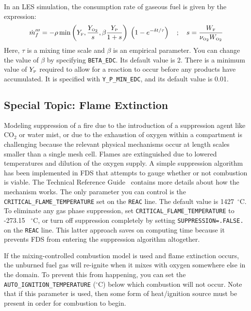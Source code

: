 \documentclass[11pt]{book}
\newcommand{\ct}{\tt\small}
\newcommand{\dt}{\delta t}
\newcommand{\dm}{\dot{m}}
\newcommand{\be}{\begin{equation}}
\newcommand{\ee}{\end{equation}}
\newcommand{\OTWO}{{\tiny \hbox{O}_2}}
\newcommand{\F}{{\tiny \hbox{F}}}
\begin{document}
In an LES simulation, the consumption rate of gaseous fuel is given by the expression:
\be \dm_f''' = -\rho \min \left( Y_\F , \frac{Y_\OTWO}{s}, \beta \frac{Y_{\hbox{\tiny P}}}{1+s} \right) \; \left( 1 - e^{-\dt/\tau} \right)   \quad ; \quad
   s=\frac{W_\F}{\nu_{\OTWO} W_{\OTWO} }  \ee
Here, $\tau$ is a mixing time scale and $\beta$ is an empirical parameter. You can change the value of $\beta$ by specifying {\ct BETA\_EDC}. Its default value
is 2. There is a minimum value of $Y_{\hbox{\tiny P}}$ required to allow for a reaction to occur before any products have accumulated. It is specified with
{\ct Y\_P\_MIN\_EDC}, and its default value is 0.01.




\subsection{Special Topic: Flame Extinction}

\label{info:extinction}

Modeling suppression of a fire due to the introduction of a suppression
agent like CO$_2$ or water mist, or due to the exhaustion of oxygen
within a compartment is challenging because
the relevant physical mechanisms occur at length scales smaller than a
single mesh cell. Flames are extinguished due to lowered
temperatures and dilution of the oxygen supply. A simple
suppression algorithm has been implemented in FDS that attempts to
gauge whether or not combustion is viable. The Technical Reference Guide~\cite{FDS_Math_Guide}
contains more details about how the mechanism works. The only
parameter you can control is the {\ct CRITICAL\_FLAME\_TEMPERATURE} set on the {\ct REAC} line.
The default value is 1427~$^\circ$C.
To eliminate any gas phase suppression, set  {\ct CRITICAL\_FLAME\_TEMPERATURE} to -273.15 ~$^\circ$C, or turn off suppression completely
by setting {\ct SUPPRESSION=.FALSE.} on the {\ct REAC} line. This latter approach saves on computing time because it
prevents FDS from entering the suppression algorithm altogether.

If the mixing-controlled combustion model is used and flame extinction occurs, the unburned fuel gas will re-ignite when it mixes with oxygen somewhere
else in the domain. To prevent this from happening, you can set the {\ct AUTO\_IGNITION\_TEMPERATURE} ($^\circ$C) below which combustion will not occur.
Note that if this parameter is used, then some form of heat/ignition source must be present in order for combustion to begin.
\end{document}
